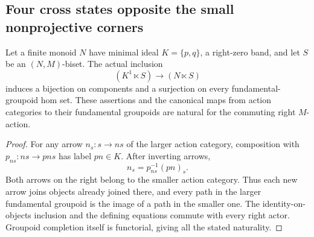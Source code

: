 \subsection{Four cross states opposite the small nonprojective corners}

\begin{lemma}
\label{C:right-zero-graph-fundamental-quotient}
Let a finite monoid $N$ have minimal ideal $K=\{p,q\}$, a
right-zero band, and let $S$ be an $(N,M)$-biset.
The actual inclusion
\[
 (K^1\ltimes S)\longrightarrow(N\ltimes S)
\]
induces a bijection on components and a surjection on every
fundamental-groupoid hom set. These assertions and the canonical
maps from action categories to their fundamental groupoids are
natural for the commuting right $M$-action.
\end{lemma}
\begin{proof}
For any arrow $n_s:s\to ns$ of the larger action category,
composition with $p_{ns}:ns\to pns$ has label $pn\in K$.
After inverting arrows,
\[
 n_s=p_{ns}^{-1}(pn)_s.
\]
Both arrows on the right belong to the smaller action category.
Thus each new arrow joins objects already joined there, and
every path in the larger fundamental groupoid is the image
of a path in the smaller one. The identity-on-objects inclusion
and the defining equations commute with every right actor.
Groupoid completion itself is functorial, giving all the stated
naturality.
\end{proof}

